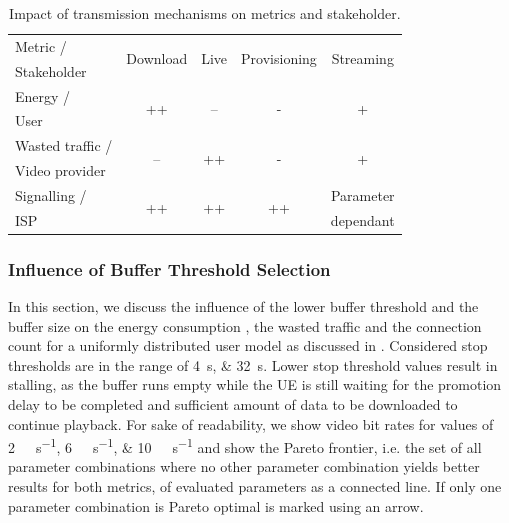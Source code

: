 \begin{table}
  \centering
  \begin{tabular}{lcccc}
    \toprule
    Metric /& \multirow{2}{*}{Download} & \multirow{2}{*}{Live} & \multirow{2}{*}{Provisioning} & \multirow{2}{*}{Streaming}\\
    Stakeholder & & & &\\
    \midrule
    Energy /       & \multirow{2}{*}{++}       & \multirow{2}{*}{--}   & \multirow{2}{*}{-} & \multirow{2}{*}{+}\\
    User & & & &\\
    Wasted traffic / & \multirow{2}{*}{--} & \multirow{2}{*}{++} & \multirow{2}{*}{-} & \multirow{2}{*}{+} \\
    Video provider & & & &\\
    Signalling /& \multirow{2}{*}{++} & \multirow{2}{*}{++} & \multirow{2}{*}{++} & Parameter\\
    \gls{ISP} & & & &dependant\\
    \bottomrule
  \end{tabular}
  \caption{Impact of transmission mechanisms on metrics and stakeholder.}
  \label{tab:application:lte_video:trade_offs:mechanism_selection:lessons_learned}
\end{table}

\subsubsection*{Influence of Buffer Threshold Selection}\label{sec:application:lte_video:trade_offs:buffer_threshold_influence}

In this section, we discuss the influence of the lower buffer threshold \bufferlower and the buffer size \buffersize on the energy consumption \energyconsumption, the wasted traffic \meanwastedtraffic and the connection count \connectioncount for a uniformly distributed user model as discussed in .
Considered stop thresholds are in the range of \SIlist{4;32}{\second}.
Lower stop threshold values result in stalling, as the buffer runs empty while the \gls{UE} is still waiting for the promotion delay to be completed and sufficient amount of data to be downloaded to continue playback.
For sake of readability, we show video bit rates \bitrate for values of \SIlist{2;6;10}{\mega\bit\per\second} and show the Pareto frontier, i.e. the set of all parameter combinations where no other parameter combination yields better results for both metrics, of evaluated parameters as a connected line.
If only one parameter combination is Pareto optimal is marked using an arrow.


